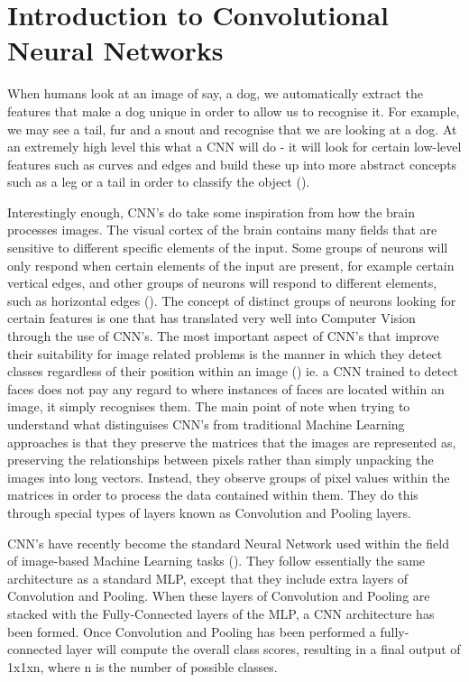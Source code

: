 \documentclass[12pt]{report}
\begin{document}
\section{Introduction to Convolutional Neural Networks}
\begin{flushleft}
When humans look at an image of say, a dog, we automatically extract the features that make a dog unique in order to allow us to recognise it. For example, we may see a tail, fur and a snout and recognise that we are looking at a dog. At an extremely high level this what a CNN will do - it will look for certain low-level features such as curves and edges and build these up into more abstract concepts such as a leg or a tail in order to classify the object (\cite{lecun1995convolutional}).
\end{flushleft}

\begin{flushleft}
Interestingly enough, CNN's do take some inspiration from how the brain processes images. The visual cortex of the brain contains many fields that are sensitive to different specific elements of the input. Some groups of neurons will only respond when certain elements of the input are present, for example certain vertical edges, and other groups of neurons will respond to different elements, such as horizontal edges (\cite{youtube}). The concept of distinct groups of neurons looking for certain features is one that has translated very well into Computer Vision through the use of CNN's. The most important aspect of CNN's that improve their suitability for image related problems is the manner in which they detect classes regardless of their position within an image (\cite{albawi2017understanding}) ie. a CNN trained to detect faces does not pay any regard to where instances of faces are located within an image, it simply recognises them. The main point of note when trying to understand what distinguises CNN's from traditional Machine Learning approaches is that they preserve the matrices that the images are represented as, preserving the relationships between pixels rather than simply unpacking the images into long vectors. Instead, they observe groups of pixel values within the matrices in order to process the data contained within them. They do this through special types of layers known as Convolution and Pooling layers.
\end{flushleft}

\begin{flushleft}
CNN's have recently become the standard Neural Network used within the field of image-based Machine Learning tasks (\cite{o2015introduction}). They follow essentially the same architecture as a standard MLP, except that they include extra layers of Convolution and Pooling. When these layers of Convolution and Pooling are stacked with the Fully-Connected layers of the MLP, a CNN architecture has been formed. Once Convolution and Pooling has been performed a fully-connected layer will compute the overall class scores, resulting in a final output of 1x1xn, where n is the number of possible classes.
\end{flushleft}
\end{document}
